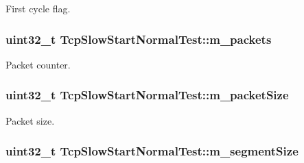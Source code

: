 First cycle flag. 

\subsubsection[{\texorpdfstring{m\+\_\+packets}{m_packets}}]{\setlength{\rightskip}{0pt plus 5cm}uint32\+\_\+t Tcp\+Slow\+Start\+Normal\+Test\+::m\+\_\+packets\hspace{0.3cm}{\ttfamily [private]}}\hypertarget{classTcpSlowStartNormalTest_a42642a5ac7d4c64d185f4cb96d53d68e}{}\label{classTcpSlowStartNormalTest_a42642a5ac7d4c64d185f4cb96d53d68e}


Packet counter. 

\subsubsection[{\texorpdfstring{m\+\_\+packet\+Size}{m_packetSize}}]{\setlength{\rightskip}{0pt plus 5cm}uint32\+\_\+t Tcp\+Slow\+Start\+Normal\+Test\+::m\+\_\+packet\+Size\hspace{0.3cm}{\ttfamily [private]}}\hypertarget{classTcpSlowStartNormalTest_a2784d554fee242ca15747e7e9bd0c361}{}\label{classTcpSlowStartNormalTest_a2784d554fee242ca15747e7e9bd0c361}


Packet size. 

\subsubsection[{\texorpdfstring{m\+\_\+segment\+Size}{m_segmentSize}}]{\setlength{\rightskip}{0pt plus 5cm}uint32\+\_\+t Tcp\+Slow\+Start\+Normal\+Test\+::m\+\_\+segment\+Size\hspace{0.3cm}{\ttfamily [private]}}\hypertarget{classTcpSlowStartNormalTest_a9ee594f2cab933a6e4bfb429da1ec53f}{}\label{classTcpSlowStartNormalTest_a9ee594f2cab933a6e4bfb429da1ec53f}


